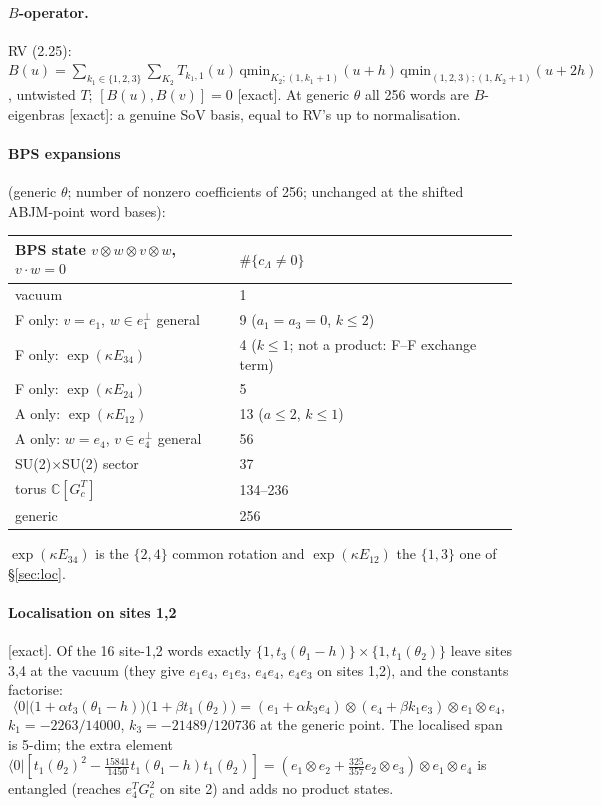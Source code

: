 \documentclass[11pt]{article}
\newcommand{\ex}{\textsf{[exact]}}
\newcommand{\bra}[1]{\langle#1|}
\begin{document}
\paragraph{$B$-operator.} RV (2.25): $B(u)=\sum_{k_1\in\{1,2,3\}}\sum_{K_2}T_{k_1,1}(u)\,\mathrm{qmin}_{K_2;(1,k_1+1)}(u+h)\,
\mathrm{qmin}_{(1,2,3);(1,K_2+1)}(u+2h)$, untwisted $T$; $[B(u),B(v)]=0$ \ex. At generic $\theta$ all 256 words are
$B$-eigenbras \ex: a genuine SoV basis, equal to RV's up to normalisation.

\paragraph{BPS expansions} (generic $\theta$; number of nonzero coefficients of 256; unchanged at the shifted ABJM-point
word bases):
\begin{center}
\begin{tabular}{ll}
\toprule
BPS state $v\otimes w\otimes v\otimes w$, $v\cdot w=0$ & $\#\{c_\Lambda\ne0\}$\\
\midrule
vacuum & 1\\
F only: $v=e_1$, $w\in e_1^\perp$ general & 9 ($a_1=a_3=0$, $k\le2$)\\
F only: $\exp(\kappa E_{34})$ & 4 ($k\le1$; not a product: F--F exchange term)\\
F only: $\exp(\kappa E_{24})$ & 5\\
A only: $\exp(\kappa E_{12})$ & 13 ($a\le2$, $k\le1$)\\
A only: $w=e_4$, $v\in e_4^\perp$ general & 56\\
SU(2)$\times$SU(2) sector & 37\\
torus $\mathbb C[G_c^T]$ & 134--236\\
generic & 256\\
\bottomrule
\end{tabular}
\end{center}
$\exp(\kappa E_{34})$ is the $\{2,4\}$ common rotation and $\exp(\kappa E_{12})$ the $\{1,3\}$ one of \S\ref{sec:loc}.

\paragraph{Localisation on sites 1,2} \ex. Of the 16 site-1,2 words exactly $\{1,t_3(\theta_1-h)\}\times\{1,t_1(\theta_2)\}$ leave
sites 3,4 at the vacuum (they give $e_1e_4$, $e_1e_3$, $e_4e_4$, $e_4e_3$ on sites 1,2), and the constants factorise:
\begin{equation}
 \bra0\big(1+\alpha t_3(\theta_1-h)\big)\big(1+\beta t_1(\theta_2)\big)=(e_1+\alpha k_3e_4)\otimes(e_4+\beta k_1e_3)\otimes e_1\otimes e_4,
\end{equation}
$k_1=-2263/14000$, $k_3=-21489/120736$ at the generic point. The localised span is 5-dim; the extra element
$\bra0[t_1(\theta_2)^2-\tfrac{15841}{1450}t_1(\theta_1-h)t_1(\theta_2)]=(e_1\otimes e_2+\tfrac{325}{357}e_2\otimes e_3)\otimes e_1\otimes e_4$
is entangled (reaches $e_4^TG_c^2$ on site 2) and adds no product states.
\end{document}
